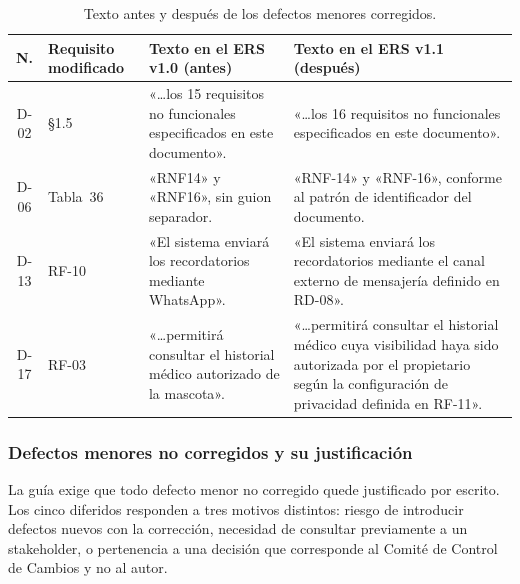 \documentclass[journal,onecolumn]{IEEEtran}
\begin{document}
	\begin{table}[h!]
		\centering
		\caption{Texto antes y después de los defectos menores corregidos.}
		\label{tab:antes-despues-menores}
		\begin{tabular}{
				|c
				|>{\raggedright\arraybackslash}p{2.3cm}
				|>{\raggedright\arraybackslash}p{5cm}
				|>{\raggedright\arraybackslash}p{5cm}|
			}
			\hline
			\textbf{N.\textordmasculine{}} & \textbf{Requisito modificado} & \textbf{Texto en el ERS v1.0 (antes)} & \textbf{Texto en el ERS v1.1 (después)} \\
			\hline
			D-02 & \S1.5 &
			«…los 15 requisitos no funcionales especificados en este
			documento». &
			«…los 16 requisitos no funcionales especificados en este
			documento». \\
			\hline
			D-06 & Tabla~36 &
			«RNF14» y «RNF16», sin guion separador. &
			«RNF-14» y «RNF-16», conforme al patrón de identificador
			del documento. \\
			\hline
			D-13 & RF-10 &
			«El sistema enviará los recordatorios mediante
			WhatsApp». &
			«El sistema enviará los recordatorios mediante el canal
			externo de mensajería definido en RD-08». \\
			\hline
			D-17 & RF-03 &
			«…permitirá consultar el historial médico autorizado de la
			mascota». &
			«…permitirá consultar el historial médico cuya visibilidad
			haya sido autorizada por el propietario según la configuración de
			privacidad definida en RF-11». \\
			\hline
		\end{tabular}
	\end{table}
	
	\subsubsection{Defectos menores no corregidos y su justificación}
	
	La guía exige que todo defecto menor no corregido quede justificado por
	escrito. Los cinco diferidos responden a tres motivos distintos: riesgo de
	introducir defectos nuevos con la corrección, necesidad de consultar
	previamente a un stakeholder, o pertenencia a una decisión que corresponde
	al Comité de Control de Cambios y no al autor.
	
\end{document}
